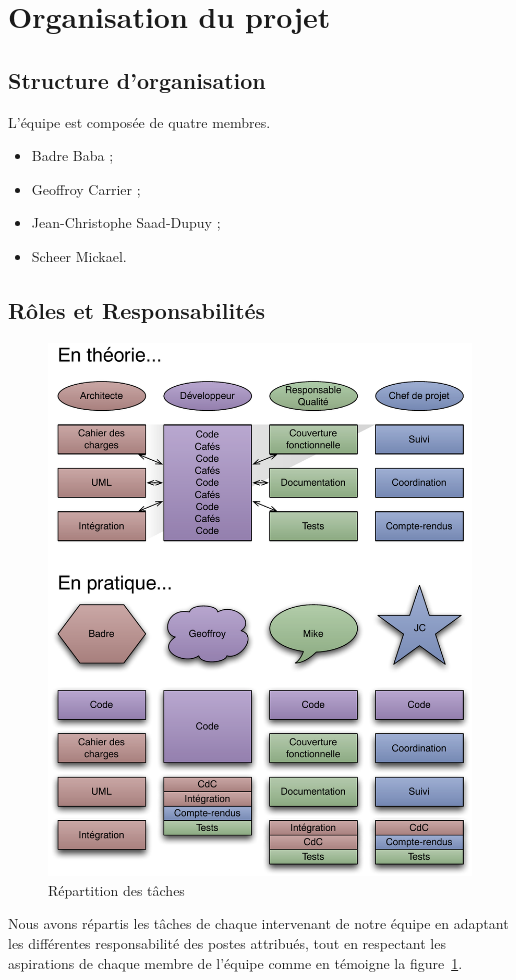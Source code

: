 
\section{Organisation du projet}
\subsection{Structure d’organisation}
L'équipe est composée de quatre membres.
\begin{itemize}
	\item Badre Baba ;
	\item Geoffroy Carrier ;
	\item Jean-Christophe Saad-Dupuy ;
	\item Scheer Mickael.
\end{itemize}

\subsection{Rôles et Responsabilités}
\begin{figure}[thbp]
	\centering
		\includegraphics[width=15cm]{../diagrammes/repartition_taches.pdf}
	\caption{Répartition des tâches}
	\label{fig:repartition}
\end{figure}

Nous avons répartis les tâches de chaque intervenant de notre équipe en adaptant les différentes responsabilité des postes attribués, tout en respectant les aspirations de chaque membre de l'équipe comme en témoigne la figure~\ref{fig:repartition}.

